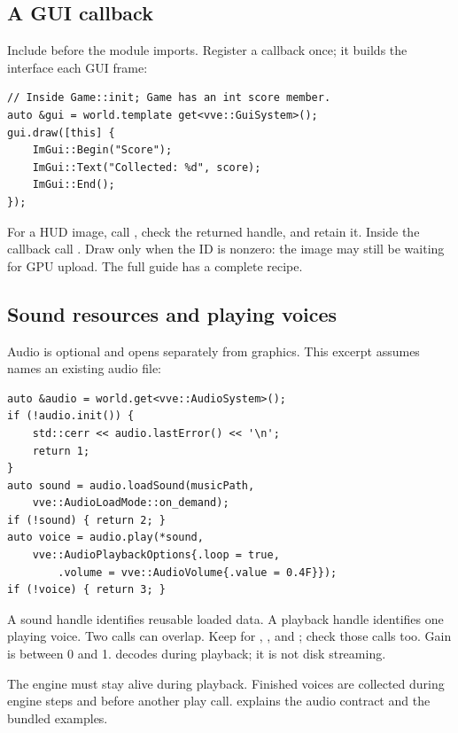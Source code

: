 \documentclass[11pt,a4paper]{article}
\begin{document}
\subsection*{A GUI callback}
Include  before the module imports. Register a callback once; it builds the interface each GUI frame:
\begin{lstlisting}
// Inside Game::init; Game has an int score member.
auto &gui = world.template get<vve::GuiSystem>();
gui.draw([this] {
    ImGui::Begin("Score");
    ImGui::Text("Collected: %d", score);
    ImGui::End();
});
\end{lstlisting}
For a HUD image, call , check the returned handle, and retain it. Inside the callback call . Draw only when the ID is nonzero: the image may still be waiting for GPU upload. The full guide has a complete recipe.

\subsection*{Sound resources and playing voices}
Audio is optional and opens separately from graphics. This excerpt assumes  names an existing audio file:
\begin{lstlisting}
auto &audio = world.get<vve::AudioSystem>();
if (!audio.init()) {
    std::cerr << audio.lastError() << '\n';
    return 1;
}
auto sound = audio.loadSound(musicPath,
    vve::AudioLoadMode::on_demand);
if (!sound) { return 2; }
auto voice = audio.play(*sound,
    vve::AudioPlaybackOptions{.loop = true,
        .volume = vve::AudioVolume{.value = 0.4F}});
if (!voice) { return 3; }
\end{lstlisting}
A sound handle identifies reusable loaded data. A playback handle identifies one playing voice. Two  calls can overlap. Keep  for , , and ; check those calls too. Gain is between 0 and 1.  decodes during playback; it is not disk streaming.

The engine must stay alive during playback. Finished voices are collected during engine steps and before another play call.  explains the audio contract and the bundled examples.
\end{document}
